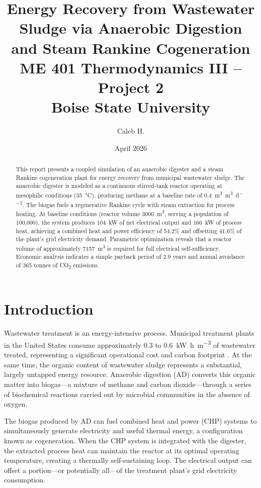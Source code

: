 \documentclass[12pt, letterpaper]{article}
\title{%
  \textbf{Energy Recovery from Wastewater Sludge via Anaerobic Digestion and Steam Rankine Cogeneration} \\[0.5em]
  \large ME 401 Thermodynamics III -- Project 2 \\
  Boise State University
}
\author{Caleb H.}
\date{April 2026}
\begin{document}
\maketitle

\begin{abstract}
This report presents a coupled simulation of an anaerobic digester and a steam Rankine cogeneration plant for energy recovery from municipal wastewater sludge. The anaerobic digester is modeled as a continuous stirred-tank reactor operating at mesophilic conditions (\SI{35}{\celsius}), producing methane at a baseline rate of \SI{0.4}{\cubic\metre\per\cubic\metre\per\day}. The biogas fuels a regenerative Rankine cycle with steam extraction for process heating. At baseline conditions (reactor volume \SI{3000}{\cubic\metre}, serving a population of 100,000), the system produces \SI{104}{\kilo\watt} of net electrical output and \SI{166}{\kilo\watt} of process heat, achieving a combined heat and power efficiency of 54.2\% and offsetting 41.6\% of the plant's grid electricity demand. Parametric optimization reveals that a reactor volume of approximately \SI{7157}{\cubic\metre} is required for full electrical self-sufficiency. Economic analysis indicates a simple payback period of 2.9 years and annual avoidance of 365 tonnes of CO\textsubscript{2} emissions.
\end{abstract}

\section{Introduction}

Wastewater treatment is an energy-intensive process. Municipal treatment plants in the United States consume approximately \SI{0.3}{} to \SI{0.6}{\kilo\watt\hour\per\cubic\metre} of wastewater treated, representing a significant operational cost and carbon footprint \citep{nathia2018}. At the same time, the organic content of wastewater sludge represents a substantial, largely untapped energy resource. Anaerobic digestion (AD) converts this organic matter into biogas---a mixture of methane and carbon dioxide---through a series of biochemical reactions carried out by microbial communities in the absence of oxygen.

The biogas produced by AD can fuel combined heat and power (CHP) systems to simultaneously generate electricity and useful thermal energy, a configuration known as cogeneration. When the CHP system is integrated with the digester, the extracted process heat can maintain the reactor at its optimal operating temperature, creating a thermally self-sustaining loop. The electrical output can offset a portion---or potentially all---of the treatment plant's grid electricity consumption.
\end{document}
